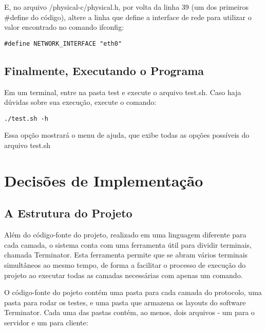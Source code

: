 \documentclass[11pt]{article}
\begin{document}
        E, no arquivo /physical-c/physical.h, por volta da linha 39 (um dos primeiros \#define do código), altere a linha que define a interface de rede para utilizar o valor encontrado no comando ifconfig: 

\begin{lstlisting}
#define NETWORK_INTERFACE "eth0"
\end{lstlisting}  
        

	\subsection{Finalmente, Executando o Programa}
	    Em um terminal, entre na pasta test e execute o arquivo test.sh. Caso haja dúvidas sobre sua execução, execute o comando:
	    
\begin{lstlisting}
./test.sh -h
\end{lstlisting}
	
	    Essa opção mostrará o menu de ajuda, que exibe todas as opções possíveis do arquivo test.sh
	
	
\section{Decisões de Implementação}
	
	\subsection{A Estrutura do Projeto}
		
		Além do código-fonte do projeto, realizado em uma linguagem diferente para cada camada, o sistema conta com uma ferramenta útil para dividir terminais, chamada Terminator. Esta ferramenta permite que se abram vários terminais simultâneos ao mesmo tempo, de forma a facilitar o processo de execução do projeto ao executar todas as camadas necessárias com apenas um comando.
		
		O código-fonte do pojeto contém uma pasta para cada camada do protocolo, uma pasta para rodar os testes, e uma pasta que armazena os layouts do software Terminator. Cada uma das pastas contém, ao menos, dois arquivos - um para o servidor e um para cliente:
		
\end{document}
